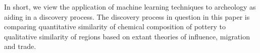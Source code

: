 In short, we view the application of machine learning techniques to archeology as aiding in a discovery process. The discovery process in question in this paper is comparing quantitative similarity of chemical composition of pottery to qualitative similarity of regions based on extant theories of influence, migration and trade. 


